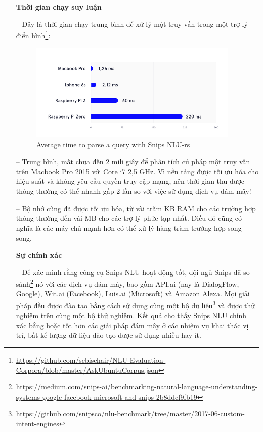 \begin{itemize}
	\textbf{Thời gian chạy suy luận} 
 
	\item[--] Đây là thời gian chạy trung bình để xử lý một truy vấn trong một trợ lý điển hình\footnote{\url{https://github.com/sebischair/NLU-Evaluation-Corpora/blob/master/AskUbuntuCorpus.json}}:

	\begin{figure}[htp]
    \centering
    \includegraphics[width=10cm]{images/ComparisonOfNLU/averageTime.png}
    \caption{Average time to parse a query with Snips NLU-rs}
    \label{fig:system-class-intent}
\end{figure}

	\item[--]Trung bình, mất chưa đến 2 mili giây để phân tích cú pháp một truy vấn trên Macbook Pro 2015 với Core i7 2,5 GHz. Vì nền tảng được tối ưu hóa cho hiệu suất và không yêu cầu quyền truy cập mạng, nên thời gian thu được thông thường có thể nhanh gấp 2 lần so với việc sử dụng dịch vụ đám mây!
	
	\item[--]Bộ nhớ cũng đã được tối ưu hóa, từ vài trăm KB RAM cho các trường hợp thông thường đến vài MB cho các trợ lý phức tạp nhất. Điều đó cũng có nghĩa là các máy chủ mạnh hơn có thể xử lý hàng trăm trường hợp song song.
	
	\textbf{Sự chính xác} 
	
	\item[--]Để xác minh rằng công cụ Snips NLU hoạt động tốt, đội ngũ Snips đã so sánh\footnote{\url{https://medium.com/snips-ai/benchmarking-natural-language-understanding-systems-google-facebook-microsoft-and-snips-2b8ddcf9fb19}} nó với các dịch vụ đám mây, bao gồm API.ai (nay là DialogFlow, Google), Wit.ai (Facebook), Luis.ai (Microsoft) và Amazon Alexa. Mọi giải pháp đều được đào tạo bằng cách sử dụng cùng một bộ dữ liệu\footnote{\url{https://github.com/snipsco/nlu-benchmark/tree/master/2017-06-custom-intent-engines}} và được thử nghiệm trên cùng một bộ thử nghiệm. Kết quả cho thấy Snips NLU chính xác bằng hoặc tốt hơn các giải pháp đám mây ở các nhiệm vụ khai thác vị trí, bất kể lượng dữ liệu đào tạo được sử dụng nhiều hay ít.


\end{itemize}
